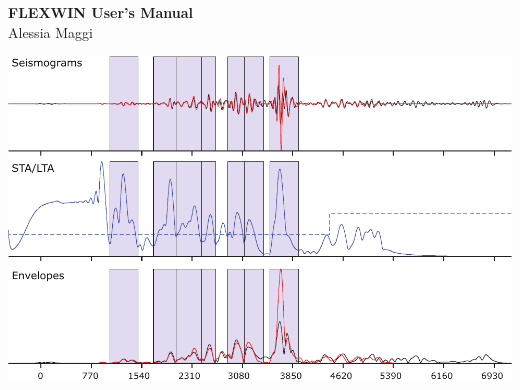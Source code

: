 \documentclass[11pt]{report}
\begin{document}


\thispagestyle{empty}
\begin{center}

\huge {\bf FLEXWIN User's Manual} \\

\vspace{1.0cm}
\Large Alessia Maggi
\end{center}

\vspace{1.0cm}
\hspace{-0.7cm}
\includegraphics[width=7in]{ABKT.pdf}
\newpage


\tableofcontents










\end{document}
